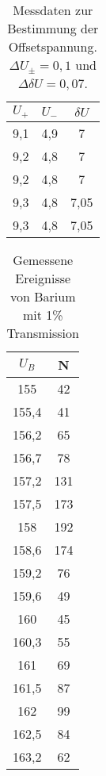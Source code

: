 \begin{table}[h]
    \centering
    \caption{Messdaten zur Bestimmung der Offsetspannung. $\Delta U_\pm=0,1$ und $\Delta \delta U=0,07$.}
    \label{tab:offsetspannung}
    \begin{tabular}{c c c}
      \toprule
      $U_+$ & $U_-$ & $\delta U$\\
      \midrule
      9,1&4,9&7\\
      9,2&4,8&7\\
      9,2&4,8&7\\
      9,3&4,8&7,05\\
      9,3&4,8&7,05\\
      \bottomrule
    \end{tabular}
  \end{table}

\begin{table}[h]
\centering
\caption{Gemessene Ereignisse von Barium mit 1\% Transmission}
\begin{tabular}{cc}
\toprule
$U_B$ & N\\
\midrule
155&	42\\
155,4&	41\\
156,2&	65\\
156,7&	78\\
157,2&	131\\
157,5&	173\\
158&	192\\
158,6&	174\\
159,2&	76\\
159,6&	49\\
160&	45\\
160,3&	55\\
161&	69\\
161,5&	87\\
162&	99\\
162,5&	84\\
163,2&	62\\
\bottomrule
\end{tabular}
\label{tab:grob}
\end{table}

